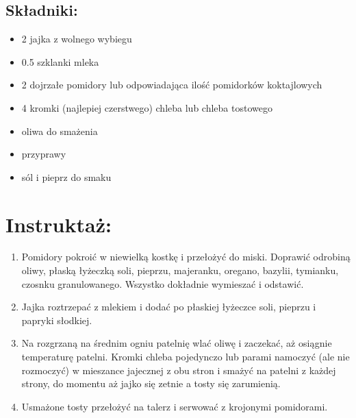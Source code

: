 \documentclass[a4paper,10pt]{book}
\begin{document}
\begin{multicols}{2}

\section*{Składniki:}
\begin{itemize}
    \item 2 jajka z wolnego wybiegu
    \item 0.5 szklanki mleka
    \item 2 dojrzałe pomidory lub odpowiadająca ilość pomidorków koktajlowych
    \item 4 kromki (najlepiej czerstwego) chleba lub chleba tostowego
    \item oliwa do smażenia
    \item przyprawy
    \item sól i pieprz do smaku
\end{itemize}

\columnbreak

\begin{figure}[H]
    \centering
\end{figure}

\end{multicols}

\vspace{0.5cm} 

\section*{Instruktaż:}
\begin{enumerate}
    \item Pomidory pokroić w niewielką kostkę i przełożyć do miski. Doprawić odrobiną oliwy, płaską łyżeczką soli, pieprzu, majeranku, oregano, bazylii, tymianku, czosnku granulowanego. Wszystko dokładnie wymieszać i odstawić.
    \item Jajka roztrzepać z mlekiem i dodać po płaskiej łyżeczce soli, pieprzu i papryki słodkiej.
    \item Na rozgrzaną na średnim ogniu patelnię wlać oliwę i zaczekać, aż osiągnie temperaturę patelni. Kromki chleba pojedynczo lub parami namoczyć (ale nie rozmoczyć) w mieszance jajecznej z obu stron i smażyć na patelni z każdej strony, do momentu aż jajko się zetnie a tosty się zarumienią.
    \item Usmażone tosty przełożyć na talerz i serwować z krojonymi pomidorami.
\end{enumerate}
\end{document}
